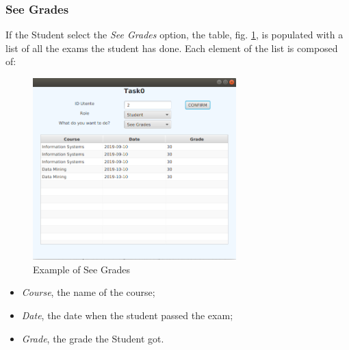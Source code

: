 \documentclass{report}
\begin{document}
\subsubsection*{See Grades}
If the Student select the \textit{See Grades} option, the table, fig. \ref{fig:SeeGrades}, is populated with a list of all the exams the student has done. Each element of the list is composed of:
\begin{figure} [h!]
	\centering
	\includegraphics[width=0.7\textwidth]{SeeGrades.png}
	\caption{Example of See Grades}
	\label{fig:SeeGrades}
\end{figure}
\begin{itemize}
	\item \textit{Course}, the name of the course;
	\item \textit{Date}, the date when the student passed the exam;
	\item \textit{Grade}, the grade the Student got. 
\end{itemize}


\begin{thebibliography}{9}
\end{thebibliography}
\end{document}

